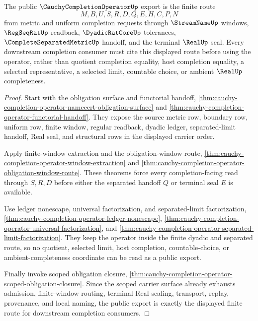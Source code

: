 \begin{theorem}
\label{thm:cauchy-completion-operator-public-export}
The public $\CauchyCompletionOperatorUp$ export is the finite route
$$
M,B,U,S,R,D,Q,E,H,C,P,N
$$
from metric and uniform completion requests through $\StreamNameUp$ windows, $\RegSeqRatUp$ readback, $\DyadicRatCoreUp$ tolerances, $\CompleteSeparatedMetricUp$ handoff, and the terminal $\RealUp$ seal. Every downstream completion consumer must cite this displayed route before using the operator, rather than quotient completion equality, host completion equality, a selected representative, a selected limit, countable choice, or ambient $\RealUp$ completeness.
\end{theorem}
\begin{proof}
Start with the obligation surface and functorial handoff, \autoref{thm:cauchy-completion-operator-namecert-obligation-surface} and \autoref{thm:cauchy-completion-operator-functorial-handoff}. They expose the source metric row, boundary row, uniform row, finite window, regular readback, dyadic ledger, separated-limit handoff, Real seal, and structural rows in the displayed carrier order.

Apply finite-window extraction and the obligation-window route, \autoref{thm:cauchy-completion-operator-window-extraction} and \autoref{thm:cauchy-completion-operator-obligation-window-route}. These theorems force every completion-facing read through $S,R,D$ before either the separated handoff $Q$ or terminal seal $E$ is available.

Use ledger nonescape, universal factorization, and separated-limit factorization, \autoref{thm:cauchy-completion-operator-ledger-nonescape}, \autoref{thm:cauchy-completion-operator-universal-factorization}, and \autoref{thm:cauchy-completion-operator-separated-limit-factorization}. They keep the operator inside the finite dyadic and separated route, so no quotient, selected limit, host completion, countable-choice, or ambient-completeness coordinate can be read as a public export.

Finally invoke scoped obligation closure, \autoref{thm:cauchy-completion-operator-scoped-obligation-closure}. Since the scoped carrier surface already exhausts admission, finite-window routing, terminal Real sealing, transport, replay, provenance, and local naming, the public export is exactly the displayed finite route for downstream completion consumers.
\end{proof}

